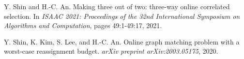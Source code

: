 \documentclass[margin, 10pt]{res} %
\begin{document}
\begin{resume}
Y. Shin and H.-C. An. Making three out of two: three-way online correlated selection. In \emph{ISAAC 2021: Proceedings of the 32nd International Symposium on Algorithms and Computation}, pages 49:1-49:17, 2021.

Y. Shin, K. Kim, S. Lee, and H.-C. An. Online graph matching problem with a worst-case reassignment budget. \emph{arXiv preprint arXiv:2003.05175}, 2020.


\end{resume}
\end{document}
